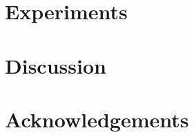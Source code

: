 \documentclass{article}
\begin{document}
\section{Experiments}
\label{sec:experiments}


\section{Discussion}
\label{sec:discussion}


\section{Acknowledgements}
\label{sec:acks}


{\small
	
	
}


\end{document}
